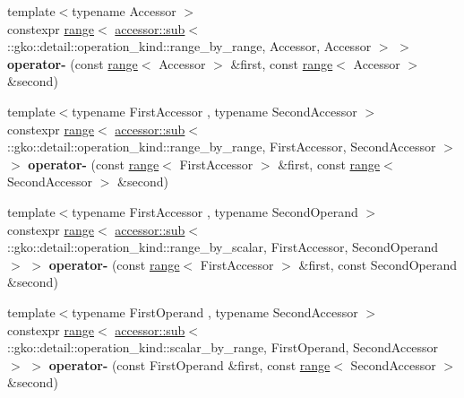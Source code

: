 \begin{DoxyCompactItemize}
\item 
\mbox{\label{namespacegko_a4c773c140e30d751bbf8826c2faf4f74}} 
{\footnotesize template$<$typename Accessor $>$ }\\constexpr \hyperlink{classgko_1_1range}{range}$<$ \hyperlink{structgko_1_1accessor_1_1sub}{accessor\+::sub}$<$ \+::gko\+::detail\+::operation\+\_\+kind\+::range\+\_\+by\+\_\+range, Accessor, Accessor $>$ $>$ {\bfseries operator-\/} (const \hyperlink{classgko_1_1range}{range}$<$ Accessor $>$ \&first, const \hyperlink{classgko_1_1range}{range}$<$ Accessor $>$ \&second)
\item 
\mbox{\label{namespacegko_ae46f88660f5606ed9da1c156bb7139b6}} 
{\footnotesize template$<$typename First\+Accessor , typename Second\+Accessor $>$ }\\constexpr \hyperlink{classgko_1_1range}{range}$<$ \hyperlink{structgko_1_1accessor_1_1sub}{accessor\+::sub}$<$ \+::gko\+::detail\+::operation\+\_\+kind\+::range\+\_\+by\+\_\+range, First\+Accessor, Second\+Accessor $>$ $>$ {\bfseries operator-\/} (const \hyperlink{classgko_1_1range}{range}$<$ First\+Accessor $>$ \&first, const \hyperlink{classgko_1_1range}{range}$<$ Second\+Accessor $>$ \&second)
\item 
\mbox{\label{namespacegko_a4d778fb0a4dd79be3297adea7a8b4e31}} 
{\footnotesize template$<$typename First\+Accessor , typename Second\+Operand $>$ }\\constexpr \hyperlink{classgko_1_1range}{range}$<$ \hyperlink{structgko_1_1accessor_1_1sub}{accessor\+::sub}$<$ \+::gko\+::detail\+::operation\+\_\+kind\+::range\+\_\+by\+\_\+scalar, First\+Accessor, Second\+Operand $>$ $>$ {\bfseries operator-\/} (const \hyperlink{classgko_1_1range}{range}$<$ First\+Accessor $>$ \&first, const Second\+Operand \&second)
\item 
\mbox{\label{namespacegko_a5d0e9697a7f202cdfef1016e535e2568}} 
{\footnotesize template$<$typename First\+Operand , typename Second\+Accessor $>$ }\\constexpr \hyperlink{classgko_1_1range}{range}$<$ \hyperlink{structgko_1_1accessor_1_1sub}{accessor\+::sub}$<$ \+::gko\+::detail\+::operation\+\_\+kind\+::scalar\+\_\+by\+\_\+range, First\+Operand, Second\+Accessor $>$ $>$ {\bfseries operator-\/} (const First\+Operand \&first, const \hyperlink{classgko_1_1range}{range}$<$ Second\+Accessor $>$ \&second)

\end{DoxyCompactItemize}
